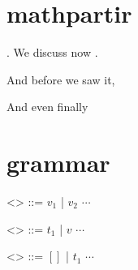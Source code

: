 \documentclass{article}
\begin{document}
\section{mathpartir}

\begin{mathpar}
\end{mathpar}

\lipsum[1][1]. We discuss now . \lipsum[1][2]

\lipsum[2-5]

\lipsum[6][1]And before we saw it, \lipsum[6][2]

\lipsum[7-10]

\lipsum[11][1]And even finally \lipsum[11][2]

\begin{mathpar}
\end{mathpar}

\section{grammar}

\resetAlignedGrammar
{}
\setupAlignedGrammar

\begin{grammar}
  \let\syntleft=\(
  \let\syntright=\)

  <\Values> ::= $v_1$ | $v_2$
           \alt $\cdots$

  <\Terms> ::= $t_1$ | $v$
           \alt $\cdots$

  <\CtxA> ::= $[]$ | $t_1$
          \alt $\cdots$
\end{grammar}
\end{document}
